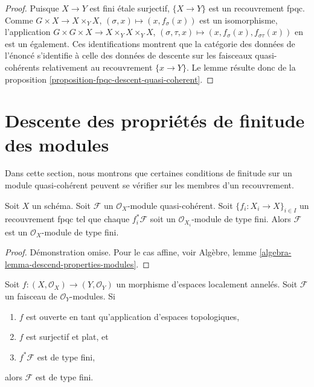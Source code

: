 \begin{proof}
Puisque $X \to Y$ est fini \'etale surjectif, $\{X \to Y\}$
est un recouvrement fpqc. Comme
$G \times X \to X \times_Y X$, $(\sigma, x) \mapsto (x, f_\sigma(x))$
est un isomorphisme, l'application
$G \times G \times X \to X \times_Y X \times_Y X$,
$(\sigma, \tau, x) \mapsto (x, f_\sigma(x), f_{\sigma\tau}(x))$
en est un également. Ces identifications montrent que la catégorie
des données de l'énoncé s'identifie à celle des données de descente
sur les faisceaux quasi-cohérents relativement au recouvrement
$\{x \to Y\}$. Le lemme résulte donc de la proposition
\ref{proposition-fpqc-descent-quasi-coherent}.
\end{proof}









\section{Descente des propriétés de finitude des modules}
\label{section-descent-finiteness}

\noindent
Dans cette section, nous montrons que certaines conditions de finitude
sur un module quasi-cohérent peuvent se vérifier sur les membres d'un
recouvrement.

\begin{lemma}
\label{lemma-finite-type-descends}
Soit $X$ un schéma.
Soit $\mathcal{F}$ un $\mathcal{O}_X$-module quasi-cohérent.
Soit $\{f_i : X_i \to X\}_{i \in I}$ un recouvrement fpqc tel que
chaque $f_i^*\mathcal{F}$ soit un $\mathcal{O}_{X_i}$-module de type fini.
Alors $\mathcal{F}$ est un $\mathcal{O}_X$-module de type fini.
\end{lemma}

\begin{proof}
Démonstration omise. Pour le cas affine, voir
Algèbre, lemme \ref{algebra-lemma-descend-properties-modules}.
\end{proof}

\begin{lemma}
\label{lemma-finite-type-descends-fppf}
Soit $f : (X, \mathcal{O}_X) \to (Y, \mathcal{O}_Y)$ un morphisme
d'espaces localement annelés. Soit $\mathcal{F}$ un faisceau de $\mathcal{O}_Y$-modules.
Si
\begin{enumerate}
\item $f$ est ouverte en tant qu'application d'espaces topologiques,
\item $f$ est surjectif et plat, et
\item $f^*\mathcal{F}$ est de type fini,
\end{enumerate}
alors $\mathcal{F}$ est de type fini.
\end{lemma}

